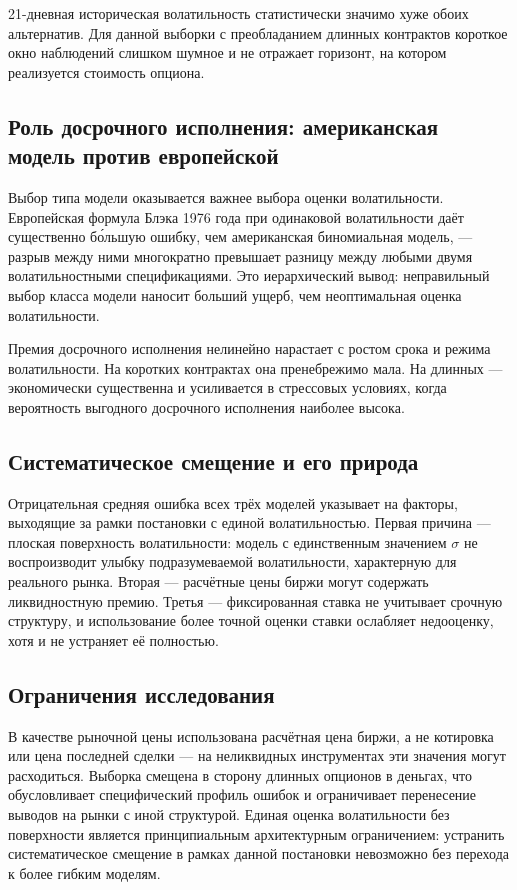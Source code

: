 \documentclass[11pt,a4paper]{article}
\begin{document}
21-дневная историческая волатильность статистически значимо хуже обоих альтернатив. Для данной выборки с преобладанием длинных контрактов короткое окно наблюдений слишком шумное и не отражает горизонт, на котором реализуется стоимость опциона.

\subsection{Роль досрочного исполнения: американская модель против европейской}

Выбор типа модели оказывается важнее выбора оценки волатильности. Европейская формула Блэка 1976 года при одинаковой волатильности даёт существенно б\'{о}льшую ошибку, чем американская биномиальная модель, --- разрыв между ними многократно превышает разницу между любыми двумя волатильностными спецификациями. Это иерархический вывод: неправильный выбор класса модели наносит больший ущерб, чем неоптимальная оценка волатильности.

Премия досрочного исполнения нелинейно нарастает с ростом срока и режима волатильности. На коротких контрактах она пренебрежимо мала. На длинных --- экономически существенна и усиливается в стрессовых условиях, когда вероятность выгодного досрочного исполнения наиболее высока.

\subsection{Систематическое смещение и его природа}

Отрицательная средняя ошибка всех трёх моделей указывает на факторы, выходящие за рамки постановки с единой волатильностью. Первая причина --- плоская поверхность волатильности: модель с единственным значением $\sigma$ не воспроизводит улыбку подразумеваемой волатильности, характерную для реального рынка. Вторая --- расчётные цены биржи могут содержать ликвидностную премию. Третья --- фиксированная ставка не учитывает срочную структуру, и использование более точной оценки ставки ослабляет недооценку, хотя и не устраняет её полностью.

\subsection{Ограничения исследования}

В качестве рыночной цены использована расчётная цена биржи, а не котировка или цена последней сделки --- на неликвидных инструментах эти значения могут расходиться. Выборка смещена в сторону длинных опционов в деньгах, что обусловливает специфический профиль ошибок и ограничивает перенесение выводов на рынки с иной структурой. Единая оценка волатильности без поверхности является принципиальным архитектурным ограничением: устранить систематическое смещение в рамках данной постановки невозможно без перехода к более гибким моделям.
\end{document}

